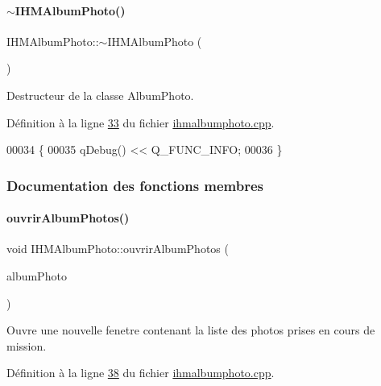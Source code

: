 \paragraph{\texorpdfstring{$\sim$\+I\+H\+M\+Album\+Photo()}{~IHMAlbumPhoto()}}
{\footnotesize\ttfamily I\+H\+M\+Album\+Photo\+::$\sim$\+I\+H\+M\+Album\+Photo (\begin{DoxyParamCaption}{ }\end{DoxyParamCaption})}



Destructeur de la classe Album\+Photo. 



Définition à la ligne \hyperlink{ihmalbumphoto_8cpp_source_l00033}{33} du fichier \hyperlink{ihmalbumphoto_8cpp_source}{ihmalbumphoto.\+cpp}.


\begin{DoxyCode}
00034 \{
00035     qDebug() << Q\_FUNC\_INFO;
00036 \}
\end{DoxyCode}


\subsubsection{Documentation des fonctions membres}
\mbox{\label{class_i_h_m_album_photo_a5aa9a9c1b04e00eaec1581e92649535f}} 
\paragraph{\texorpdfstring{ouvrir\+Album\+Photos()}{ouvrirAlbumPhotos()}}
{\footnotesize\ttfamily void I\+H\+M\+Album\+Photo\+::ouvrir\+Album\+Photos (\begin{DoxyParamCaption}\item[{Q\+Vector$<$ \hyperlink{struct_photo}{Photo} $>$}]{album\+Photo }\end{DoxyParamCaption})}



Ouvre une nouvelle fenetre contenant la liste des photos prises en cours de mission. 



Définition à la ligne \hyperlink{ihmalbumphoto_8cpp_source_l00038}{38} du fichier \hyperlink{ihmalbumphoto_8cpp_source}{ihmalbumphoto.\+cpp}.



